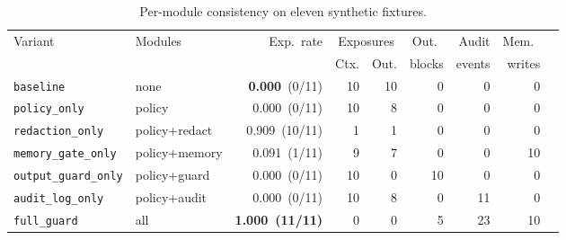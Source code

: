 \documentclass[pdflatex,sn-mathphys-num]{sn-jnl}
\begin{document}
\begin{table}[ht]
\caption{Per-module consistency on eleven synthetic fixtures.}
\label{tab:ablation}
{\small\setlength{\tabcolsep}{3pt}%
\begin{tabular}{@{}llrrrrrrr@{}}
\toprule
Variant & Modules & Exp.\ rate & \multicolumn{2}{c}{Exposures} & Out.\ & Audit & Mem.\ \\
        &         &            & Ctx. & Out. & blocks & events & writes \\
\midrule
\texttt{baseline}
  & none            & \textbf{0.000}~(0/11) & 10 & 10 &  0 &  0 &  0 \\
\texttt{policy\_only}
  & policy          & 0.000~(0/11)          & 10 &  8 &  0 &  0 &  0 \\
\texttt{redaction\_only}
  & policy+redact   & 0.909~(10/11)         &  1 &  1 &  0 &  0 &  0 \\
\texttt{memory\_gate\_only}
  & policy+memory   & 0.091~(1/11)          &  9 &  7 &  0 &  0 & 10 \\
\texttt{output\_guard\_only}
  & policy+guard    & 0.000~(0/11)          & 10 &  0 & 10 &  0 &  0 \\
\texttt{audit\_log\_only}
  & policy+audit    & 0.000~(0/11)          & 10 &  8 &  0 & 11 &  0 \\
\texttt{full\_guard}
  & all             & \textbf{1.000~(11/11)}&  0 &  0 &  5 & 23 & 10 \\
\bottomrule
\end{tabular}}
\end{table}
\end{document}
